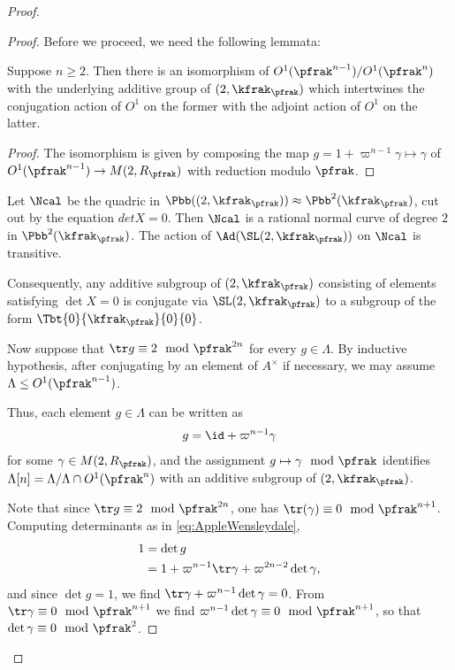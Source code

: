 \begin{proof}
\begin{proof}
    Before we proceed, we need the following lemmata:
    \begin{lemma}\label{lemma:iso}
      Suppose $n\geq 2$. Then there is an isomorphism of $O^1(\pfrak^{n-1}) / O^1(\pfrak^{n})$ with the underlying additive group of $\sl(2,\kfrak_\pfrak)$ which intertwines the conjugation action of $O^1$ on the former with the adjoint action of $O^1$ on the latter.
    \end{lemma}
    \begin{proof}
      The isomorphism is given by composing the map $g = 1 + \varpi^{n-1}\gamma \mapsto \gamma$  of $O^1(\pfrak^{n-1}) \to M(2,R_\pfrak)$ with reduction modulo $\pfrak$.
    \end{proof}

    \begin{lemma}\label{lemma:killingform}
      Let $\Ncal$ be the quadric in $\Pbb(\sl(2,\kfrak_\pfrak))\approx \Pbb^2(\kfrak_\pfrak)$, cut out by the equation $det X =0$. Then $\Ncal$ is a rational normal curve of degree $2$ in $\Pbb^2(\kfrak_\pfrak)$. The action of $\Ad(\SL(2,\kfrak_\pfrak))$ on $\Ncal$ is transitive.

      Consequently, any additive subgroup of $\sl(2,\kfrak_\pfrak)$ consisting of elements satisfying $\det X = 0$ is conjugate via $\SL(2,\kfrak_\pfrak)$ to a subgroup of the form $\Tbt{0}{\kfrak_\pfrak}{0}{0}$.
    \end{lemma}
    Now suppose that $\tr g \equiv 2 \mod \pfrak^{2n}$ for every $g\in \Lambda$. By inductive hypothesis, after conjugating by an element of $A^\times$ if necessary, we may assume $\Lambda \leq O^1(\pfrak^{n-1})$.

    Thus, each element $g\in \Lambda$ can be written as
    \begin{align}\label{eq:AppleWensleydale}
      g = \id +\varpi^{n-1} \gamma
    \end{align}
    for some $\gamma \in M(2, R_\pfrak)$, and the assignment $g \mapsto \gamma \mod \pfrak$ identifies $\Lambda[n] = \Lambda /\Lambda \cap O^1(\pfrak^n)$ with an additive subgroup of $\sl(2,\kfrak_\pfrak)$.

    Note that since $\tr g \equiv 2 \mod \pfrak^{2n}$, one has $\tr(\gamma) \equiv 0 \mod \pfrak^{n+1}$.
    Computing determinants as in \ref{eq:AppleWensleydale},
    \begin{align*}
      1 & = \det g                                                  \\
        & = 1 + \varpi^{n-1} \tr \gamma + \varpi^{2n-2}\det \gamma,
    \end{align*}
    and since $\det g =1$, we find $\tr \gamma +\varpi^{n-1}\det \gamma =0$. From $\tr \gamma  \equiv 0 \mod \pfrak^{n+1}$ we find $ \varpi^{n-1}\det \gamma \equiv 0 \mod \pfrak^{n+1}$, so that $\det \gamma \equiv 0 \mod \pfrak^2$.


\end{proof}
\end{proof}
